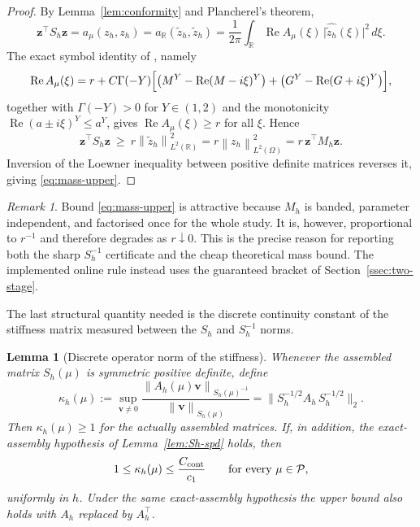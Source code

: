 \documentclass[11pt]{amsart}
\newtheorem{lemma}[theorem]{Lemma}
\theoremstyle{remark}
\newtheorem{remark}[theorem]{Remark}
\newcommand{\R}{\mathbb{R}}
\newcommand{\Pset}{\mathcal{P}}
\newcommand{\Mh}{M_h}
\newcommand{\Ah}{A_h}
\newcommand{\Sh}{S_h}
\newcommand{\norm}[1]{\left\lVert #1\right\rVert}
\newcommand{\vv}{\mathbf v}
\newcommand{\zz}{\mathbf z}
\newcommand{\rf}{r}
\DeclareMathOperator{\Real}{Re}
\begin{document}
\begin{proof}
By Lemma~\ref{lem:conformity} and Plancherel's theorem,
\[
  \zz^\top\Sh\zz=a_\mu(z_h,z_h)=a_\R(\widetilde z_h,\widetilde z_h)
  =\frac1{2\pi}\int_\R\Real A_\mu(\xi)\,\bigl|\widehat{\widetilde z_h}(\xi)\bigr|^2\,d\xi .
\]
The exact symbol identity of \cite{DamircheliCGMY2026}, namely
\begin{equation}
\Real A_\mu(\xi)
=\rf+C\Gamma(-Y)\Bigl[\bigl(M^Y-\Real(M-i\xi)^Y\bigr)
+\bigl(G^Y-\Real(G+i\xi)^Y\bigr)\Bigr],
\label{eq:symbol-real-exact}
\end{equation}
together with $\Gamma(-Y)>0$ for $Y\in(1,2)$ and the monotonicity
$\Real(a\pm i\xi)^Y\le a^Y$, gives $\Real A_\mu(\xi)\ge \rf$ for all $\xi$.  Hence
\[
  \zz^\top\Sh\zz\ \ge\ \rf\norm{\widetilde z_h}^2_{L^2(\R)}
  =\rf\norm{z_h}^2_{L^2(\Omega)}=\rf\,\zz^\top\Mh\zz .
\]
Inversion of the Loewner
inequality between positive definite matrices reverses it, giving
\eqref{eq:mass-upper}.
\end{proof}

\begin{remark}
Bound \eqref{eq:mass-upper} is attractive because $\Mh$ is banded, parameter
independent, and factorised once for the whole study.  It is, however,
proportional to $\rf^{-1}$ and therefore degrades as $\rf\downarrow0$.  This
is the precise reason for reporting both the sharp $\Sh^{-1}$ certificate and
the cheap theoretical mass bound.  The implemented online rule instead uses the guaranteed bracket of Section~\ref{ssec:two-stage}.
\end{remark}

The last structural quantity needed is the discrete continuity constant of the
stiffness matrix measured between the $\Sh$ and $\Sh^{-1}$ norms.

\begin{lemma}[Discrete operator norm of the stiffness]
\label{lem:kappa}
Whenever the assembled matrix $\Sh(\mu)$ is symmetric positive definite,
define
\begin{equation}
  \kappa_h(\mu):=\sup_{\vv\ne0}
  \frac{\norm{\Ah(\mu)\vv}_{\Sh(\mu)^{-1}}}{\norm{\vv}_{\Sh(\mu)}}
  =\bigl\lVert \Sh^{-1/2}\Ah\,\Sh^{-1/2}\bigr\rVert_2 .
  \label{eq:kappa-def}
\end{equation}
Then $\kappa_h(\mu)\ge1$ for the actually assembled matrices.  If, in addition,
the exact-assembly hypothesis of Lemma~\ref{lem:Sh-spd} holds, then
\begin{equation}
  1\le\kappa_h(\mu)\le\frac{C_{\rm cont}}{c_1}
  \qquad\text{for every }\mu\in\Pset,
  \label{eq:kappa-bound}
\end{equation}
uniformly in $h$.  Under the same exact-assembly hypothesis the upper bound
also holds with $\Ah$ replaced by $\Ah^\top$.
\end{lemma}
\end{document}
